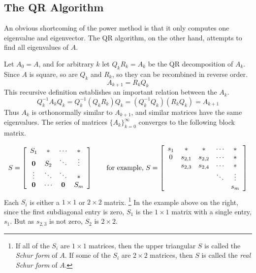 \subsection*{The QR Algorithm} %

An obvious shortcoming of the power method is that it only computes one eigenvalue and eigenvector.
The QR algorithm, on the other hand, attempts to find all eigenvalues of $A$.

Let $A_0 = A$, and for arbitrary $k$ let $Q_kR_k = A_k$ be the QR decomposition of $A_k$.
Since $A$ is square, so are $Q_k$ and $R_k$, so they can be recombined in reverse order.
\[A_{k+1}=R_kQ_k\]
This recursive definition establishes an important relation between the $A_k$.
\[Q_k^{-1}A_kQ_k = Q_k^{-1}(Q_kR_k)Q_k = (Q_k^{-1}Q_k)(R_kQ_k) = A_{k+1}\]
Thus $A_k$ is orthonormally similar to $A_{k+1}$, and similar matrices have the same eigenvalues.
The series of matrices $\{A_k\}_{k=0}^\infty$ converges to the following block matrix.

\[
S =
\left[\begin{array}{cccc}
S_1    & *      & \cdots & *      \\
\0     & S_2    & \ddots & \vdots \\
\vdots & \ddots & \ddots & *      \\
\0     & \cdots &     \0 & S_m
\end{array}\right]
\qquad
\text{for example,}\ S =
\left[\begin{array}{ccccc}
\arrayrulecolor{lightgray}
s_1 & *       & *       & \cdots & *      \\
0   & s_{2,1} & s_{2,2} & \cdots & *      \\
    & s_{2,3} & s_{2,4} & \cdots & *      \\
    &         &         & \ddots & \vdots \\
    &         &         &        & s_m    \\
\end{array}\right]
\]
Each $S_i$ is either a $1\times1$ or $2\times2$ matrix.%
\footnote{If all of the $S_i$ are $1\times1$ matrices, then the upper triangular $S$ is called the \emph{Schur form} of $A$.
If some of the $S_i$ are $2\times2$ matrices, then $S$ is called the \emph{real Schur form} of $A$.}
In the example above on the right, since the first subdiagonal entry is zero, $S_1$ is the $1\times 1$ matrix with a single entry, $s_1$.
But as $s_{2,3}$ is not zero, $S_2$ is $2\times 2$.

